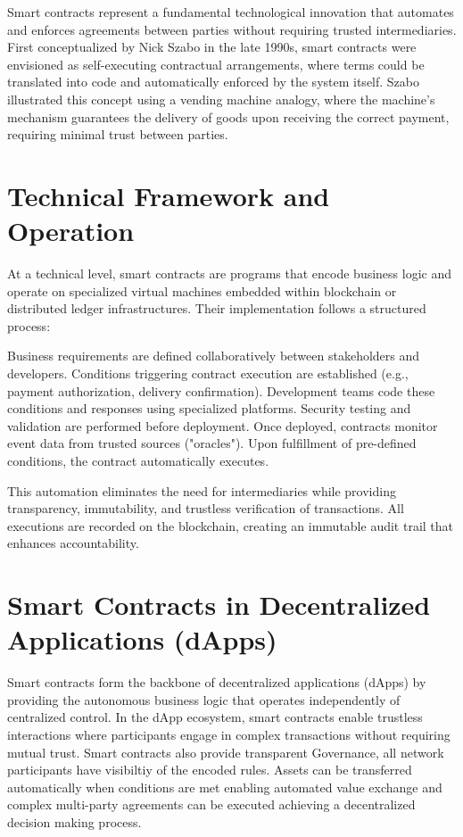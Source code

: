 \documentclass{article}
\begin{document}
Smart contracts represent a fundamental technological innovation that automates and enforces agreements between parties without requiring trusted intermediaries. First conceptualized by Nick Szabo in the late 1990s, smart contracts were envisioned as self-executing contractual arrangements, where terms could be translated into code and automatically enforced by the system itself\cite{szabo1996smart}. Szabo illustrated this concept using a vending machine analogy, where the machine's mechanism guarantees the delivery of goods upon receiving the correct payment, requiring minimal trust between parties\cite{szabo1997formalizing}.

\section{Technical Framework and Operation}

At a technical level, smart contracts are programs that encode business logic and operate on specialized virtual machines embedded within blockchain or distributed ledger infrastructures. Their implementation follows a structured process:

Business requirements are defined collaboratively between stakeholders and developers. Conditions triggering contract execution are established (e.g., payment authorization, delivery confirmation). Development teams code these conditions and responses using specialized platforms. Security testing and validation are performed before deployment. Once deployed, contracts monitor event data from trusted sources ("oracles"). Upon fulfillment of pre-defined conditions, the contract automatically executes\cite{simplilearn2022smart}.

This automation eliminates the need for intermediaries while providing transparency, immutability, and trustless verification of transactions. All executions are recorded on the blockchain, creating an immutable audit trail that enhances accountability.

\section{Smart Contracts in Decentralized Applications (dApps)}

Smart contracts form the backbone of decentralized applications (dApps) by providing the autonomous business logic that operates independently of centralized control. In the dApp ecosystem, smart contracts enable trustless interactions where participants engage in complex transactions without requiring mutual trust. Smart contracts also provide transparent Governance, all network participants have visibiltiy of the encoded rules. Assets can be transferred automatically when conditions are met enabling automated value exchange and  complex multi-party agreements can be executed achieving a decentralized decision making process\cite{alharby2017blockchain}.
\end{document}
